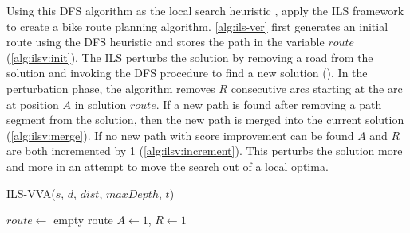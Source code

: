\documentclass[honors]{union-cs-thesis}
\begin{document}
Using this DFS algorithm as the local search heuristic \citeauthor{verbeeck2014extension}, apply the ILS framework to create a bike route planning algorithm. \cref{alg:ils-ver} first generates an initial route using the DFS heuristic and stores the path in the variable $route$ (\cref{alg:ilsv:init}). The ILS perturbs the solution by removing a road from the solution and invoking the DFS procedure to find a new solution (). In the perturbation phase, the algorithm removes $R$ consecutive arcs starting at the arc at position $A$ in solution $route$. If a new path is found after removing a path segment from the solution, then the new path is merged into the current solution (\cref{alg:ilsv:merge}). If no new path with score improvement can be found $A$ and $R$ are both incremented by 1 (\cref{alg:ilsv:increment}). This perturbs the solution more and more in an attempt to move the search out of a local optima.

%
%
\begin{algorithm}
    \caption{ILS-VVA($s$, $d$, $dist$, $maxDepth$, $t$) \label{alg:ils-ver}}
    
    $route \gets$ empty route\;
    $A \gets 1$, $R \gets 1$\;
    
    
\end{algorithm}
\end{document}
